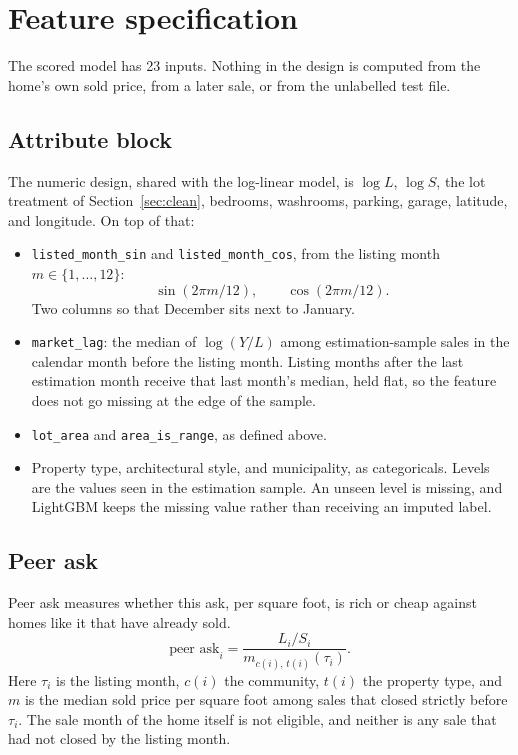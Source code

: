 \documentclass[11pt]{article}
\begin{document}
\section{Feature specification}
\label{sec:features}

The scored model has 23 inputs. Nothing in the design is computed from the home's own sold price, from a later sale, or from the unlabelled test file.

\subsection{Attribute block}

The numeric design, shared with the log-linear model, is \(\log L\), \(\log S\), the lot treatment of Section~\ref{sec:clean}, bedrooms, washrooms, parking, garage, latitude, and longitude. On top of that:

\begin{itemize}
\item \texttt{listed\_month\_sin} and \texttt{listed\_month\_cos}, from the listing month \(m \in \{1,\ldots,12\}\):
\[
\sin(2\pi m/12), \qquad \cos(2\pi m/12).
\]
Two columns so that December sits next to January.
\item \texttt{market\_lag}: the median of \(\log(Y/L)\) among estimation-sample sales in the calendar month before the listing month. Listing months after the last estimation month receive that last month's median, held flat, so the feature does not go missing at the edge of the sample.
\item \texttt{lot\_area} and \texttt{area\_is\_range}, as defined above.
\item Property type, architectural style, and municipality, as categoricals. Levels are the values seen in the estimation sample. An unseen level is missing, and LightGBM keeps the missing value rather than receiving an imputed label.
\end{itemize}

\subsection{Peer ask}

Peer ask measures whether this ask, per square foot, is rich or cheap against homes like it that have already sold.
\[
\text{peer ask}_i
= \frac{L_i / S_i}{m_{c(i),\,t(i)}(\tau_i)}.
\]
Here \(\tau_i\) is the listing month, \(c(i)\) the community, \(t(i)\) the property type, and \(m\) is the median sold price per square foot among sales that closed strictly before \(\tau_i\). The sale month of the home itself is not eligible, and neither is any sale that had not closed by the listing month.
\end{document}
